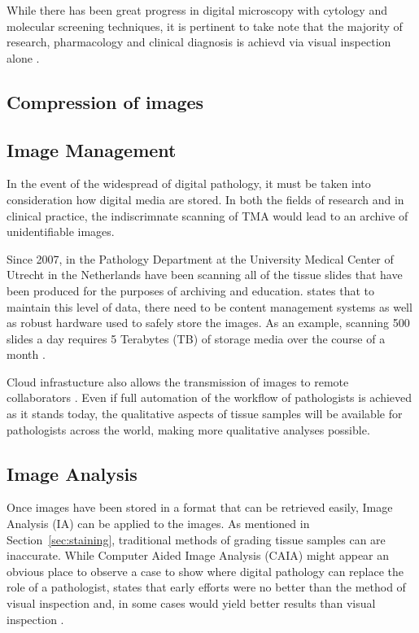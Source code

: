 \documentclass[12pt]{article}
\begin{document}
While there has been great progress in digital microscopy with cytology and molecular screening techniques, it is 
pertinent to take note that the majority of research, pharmacology and clinical diagnosis is achievd via visual 
inspection alone \parencite[p.~24]{mccavigan2012digital}.

\subsection{Compression of images}


\subsection{Image Management}
In the event of the widespread of digital pathology, it must be taken into consideration how digital media are stored. 
In both the fields of research and in clinical practice, the indiscrimnate scanning of TMA would lead to an archive 
of unidentifiable images.

Since 2007, \parencite{stathonikos2013going} in the Pathology Department at the University Medical Center of Utrecht 
in the Netherlands have been scanning all of the tissue slides that have been produced for the purposes of archiving 
and education. \parencite{hamilton2014digital} states that to maintain this level of data, there need to be content 
management systems as well as robust hardware used to safely store the images. As an example, scanning 500 slides 
a day requires 5 Terabytes (TB) of storage media over the course of a month \parencite{hamilton2014digital}.

Cloud infrastucture also allows the transmission of images to remote collaborators \parencite{webster2014whole}. Even 
if full automation of the workflow of pathologists is achieved as it stands today, the qualitative aspects of tissue 
samples will be available for pathologists across the world, making more qualitative analyses possible.

\subsection{Image Analysis} \label{sec:imageanalysis}
Once images have been stored in a format that can be retrieved easily, Image Analysis (IA) can be applied to the 
images. As mentioned in Section~\ref{sec:staining}, traditional methods of grading tissue samples can are inaccurate. 
While Computer Aided Image Analysis (CAIA) might appear an obvious place to observe a case to show where digital 
pathology can replace the role of a pathologist, \citeauthor{dabbs2013diagnostic} states that early efforts were no 
better than the method of visual inspection and, in some cases would yield better results than visual inspection 
\parencite{dabbs2013diagnostic}.
\end{document}
